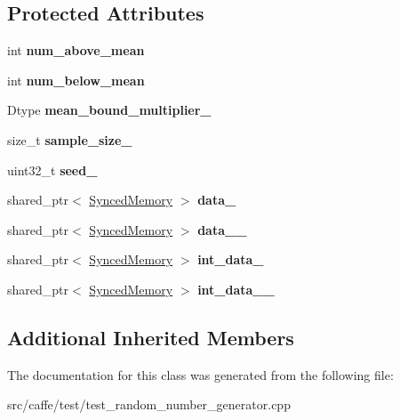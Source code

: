 \subsection*{Protected Attributes}
\begin{DoxyCompactItemize}
\item 
\mbox{\label{classcaffe_1_1_random_number_generator_test_a039d6584b589e0f3e87d215c7a230fce}} 
int {\bfseries num\+\_\+above\+\_\+mean}
\item 
\mbox{\label{classcaffe_1_1_random_number_generator_test_ab2744cd1e3f41449e2b4b2ea9087f458}} 
int {\bfseries num\+\_\+below\+\_\+mean}
\item 
\mbox{\label{classcaffe_1_1_random_number_generator_test_a7af6670320b4dd8b29edd00fcd33c899}} 
Dtype {\bfseries mean\+\_\+bound\+\_\+multiplier\+\_\+}
\item 
\mbox{\label{classcaffe_1_1_random_number_generator_test_a1e16c55d83c076ffe898f1db6f7cfc1d}} 
size\+\_\+t {\bfseries sample\+\_\+size\+\_\+}
\item 
\mbox{\label{classcaffe_1_1_random_number_generator_test_a8975ddeeefd466b91f1b39db1e526436}} 
uint32\+\_\+t {\bfseries seed\+\_\+}
\item 
\mbox{\label{classcaffe_1_1_random_number_generator_test_a0d9fe79538e2af9fdd25f93a4fe3efe8}} 
shared\+\_\+ptr$<$ \mbox{\hyperlink{classcaffe_1_1_synced_memory}{Synced\+Memory}} $>$ {\bfseries data\+\_\+}
\item 
\mbox{\label{classcaffe_1_1_random_number_generator_test_aa5d1f3c85e7b05ddae63a96ef858f208}} 
shared\+\_\+ptr$<$ \mbox{\hyperlink{classcaffe_1_1_synced_memory}{Synced\+Memory}} $>$ {\bfseries data\+\_\+\_\+}
\item 
\mbox{\label{classcaffe_1_1_random_number_generator_test_a1db28be8828105cc9c187fc6717eef0a}} 
shared\+\_\+ptr$<$ \mbox{\hyperlink{classcaffe_1_1_synced_memory}{Synced\+Memory}} $>$ {\bfseries int\+\_\+data\+\_\+}
\item 
\mbox{\label{classcaffe_1_1_random_number_generator_test_a766746e10a61c6853731eac979c42c55}} 
shared\+\_\+ptr$<$ \mbox{\hyperlink{classcaffe_1_1_synced_memory}{Synced\+Memory}} $>$ {\bfseries int\+\_\+data\+\_\+\_\+}
\end{DoxyCompactItemize}
\subsection*{Additional Inherited Members}


The documentation for this class was generated from the following file\+:\begin{DoxyCompactItemize}
\item 
src/caffe/test/test\+\_\+random\+\_\+number\+\_\+generator.\+cpp\end{DoxyCompactItemize}
